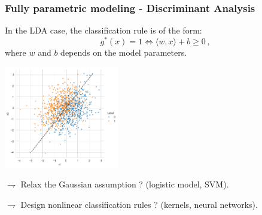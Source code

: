 \documentclass[xcolor={usenames,dvipsnames},handout]{beamer}
\begin{document}
\begin{frame}\frametitle{Fully parametric modeling - Discriminant Analysis}


In the LDA case, the classification rule is of the form:
\begin{equation*}
g^*(x) = 1 \Leftrightarrow \langle w,x \rangle + b \geqslant 0\,,
\end{equation*}
where \alert{$w$ and $b$ depends on the model parameters}.

\begin{center}
\includegraphics[width=5cm]{./logistic.png} 
\end{center}

$\rightharpoondown$ Relax the Gaussian assumption ? (\alert{logistic model, SVM}).

$\rightharpoondown$ Design  nonlinear classification rules ? (\alert{kernels, neural networks}).

\end{frame}
\end{document}

